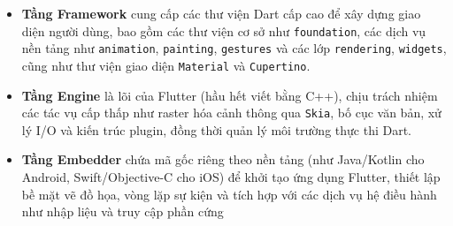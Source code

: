\documentclass[../DoAn.tex]{subfiles}
\numberwithin{figure}{chapter}
\begin{document}
\begin{itemize}
\item \textbf{Tầng Framework} cung cấp các thư viện Dart cấp cao để xây dựng giao diện người dùng, bao gồm các thư viện cơ sở như \texttt{foundation}, các dịch vụ nền tảng như \texttt{animation}, \texttt{painting}, \texttt{gestures} và các lớp \texttt{rendering}, \texttt{widgets}, cũng như thư viện giao diện \texttt{Material} và \texttt{Cupertino}.
\item \textbf{Tầng Engine} là lõi của Flutter (hầu hết viết bằng C++), chịu trách nhiệm các tác vụ cấp thấp như raster hóa cảnh thông qua \texttt{Skia}, bố cục văn bản, xử lý I/O và kiến trúc plugin, đồng thời quản lý môi trường thực thi Dart.
\item \textbf{Tầng Embedder} chứa mã gốc riêng theo nền tảng (như Java/Kotlin cho Android, Swift/Objective-C cho iOS) để khởi tạo ứng dụng Flutter, thiết lập bề mặt vẽ đồ họa, vòng lặp sự kiện và tích hợp với các dịch vụ hệ điều hành như nhập liệu và truy cập phần cứng
\end{itemize}
\end{document}
